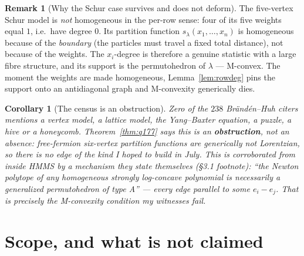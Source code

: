 \documentclass[11pt]{article}
\newtheorem{corollary}[theorem]{Corollary}
\theoremstyle{definition}
\newtheorem{remark}[theorem]{Remark}
\begin{document}
\begin{remark}[Why the Schur case survives and does not deform]
The five-vertex Schur model is \emph{not} homogeneous in the per-row sense: four of its five
weights equal $1$, i.e.\ have degree $0$. Its partition function $s_\lambda(x_1,\dots,x_n)$
is homogeneous because of the \emph{boundary} (the particles must travel a fixed total
distance), not because of the weights. The $x_i$-degree is therefore a genuine statistic
with a large fibre structure, and its support is the permutohedron of $\lambda$ --- M-convex.
The moment the weights are made homogeneous, Lemma~\ref{lem:rowdeg} pins the support onto an
antidiagonal graph and M-convexity generically dies.
\end{remark}

\begin{corollary}[The census is an obstruction]
Zero of the $238$ Br\"and\'en--Huh citers mentions a vertex model, a lattice model, the
Yang--Baxter equation, a puzzle, a hive or a honeycomb. Theorem~\ref{thm:q177} says this is
an \textbf{obstruction}, not an absence: free-fermion six-vertex partition functions are
generically not Lorentzian, so there is no edge of the kind I hoped to build in July.
This is corroborated from inside HMMS by a mechanism they state themselves (\S3.1 footnote):
\emph{``the Newton polytope of any homogeneous strongly log-concave polynomial is necessarily
a generalized permutohedron of type A''} --- every edge parallel to some $e_i-e_j$. That is
precisely the M-convexity condition my witnesses fail.
\end{corollary}

\section{Scope, and what is not claimed}
\end{document}
